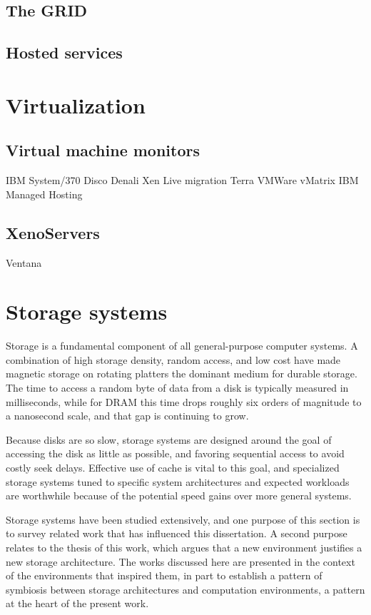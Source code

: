 \subsection{The GRID}
\cite{zhao}

\subsection{Hosted services}

\section{Virtualization}

\subsection{Virtual machine monitors}
IBM System/370 \cite{gum}
Disco
Denali
Xen \cite{barham}
Live migration \cite{clark} \cite{sapuntzakis02}
Terra \cite{garfinkel}
VMWare
vMatrix
IBM Managed Hosting

\subsection{XenoServers}
\cite{kotsovinos}

Ventana \cite{pfaff}

\section{Storage systems}

Storage is a fundamental component of all general-purpose computer systems. A combination of high storage density, random access, and low cost have made magnetic storage on rotating platters the dominant medium for durable storage. The time to access a random byte of data from a disk is typically measured in milliseconds, while for DRAM this time drops roughly six orders of magnitude to a nanosecond scale, and that gap is continuing to grow.

Because disks are so slow, storage systems are designed around the goal of accessing the disk as little as possible, and favoring sequential access to avoid costly seek delays. Effective use of cache is vital to this goal, and specialized storage systems tuned to specific system architectures and expected workloads are worthwhile because of the potential speed gains over more general systems.

Storage systems have been studied extensively, and one purpose of this section is to survey related work that has influenced this dissertation. A second purpose relates to the thesis of this work, which argues that a new environment justifies a new storage architecture. The works discussed here are presented in the context of the environments that inspired them, in part to establish a pattern of symbiosis between storage architectures and computation environments, a pattern at the heart of the present work.

